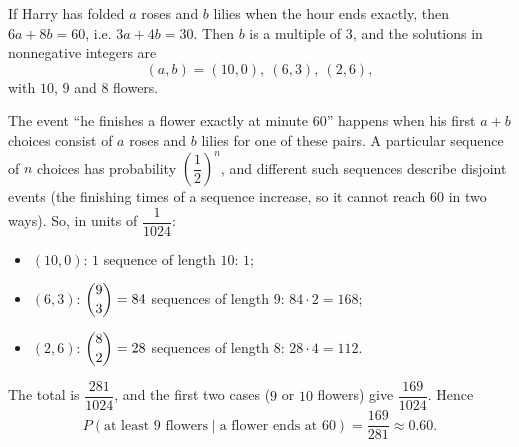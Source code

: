 If Harry has folded $a$ roses and $b$ lilies when the hour ends exactly, then $6a+8b=60$, i.e. $3a+4b=30$. Then $b$ is a multiple of $3$, and the solutions in nonnegative integers are
\[(a,b)=(10,0),\ (6,3),\ (2,6),\]
with $10$, $9$ and $8$ flowers.

The event ``he finishes a flower exactly at minute $60$'' happens when his first $a+b$ choices consist of $a$ roses and $b$ lilies for one of these pairs. A particular sequence of $n$ choices has probability $\left(\dfrac12\right)^n$, and different such sequences describe disjoint events (the finishing times of a sequence increase, so it cannot reach $60$ in two ways). So, in units of $\dfrac{1}{1024}$:
\begin{itemize}
\item $(10,0)$: $1$ sequence of length $10$: $1$;
\item $(6,3)$: $\dbinom93=84$ sequences of length $9$: $84\cdot2=168$;
\item $(2,6)$: $\dbinom82=28$ sequences of length $8$: $28\cdot4=112$.
\end{itemize}
The total is $\dfrac{281}{1024}$, and the first two cases ($9$ or $10$ flowers) give $\dfrac{169}{1024}$. Hence
\[P(\text{at least }9\text{ flowers}\mid\text{a flower ends at }60)=\boxed{\dfrac{169}{281}}\approx0.60.\]
